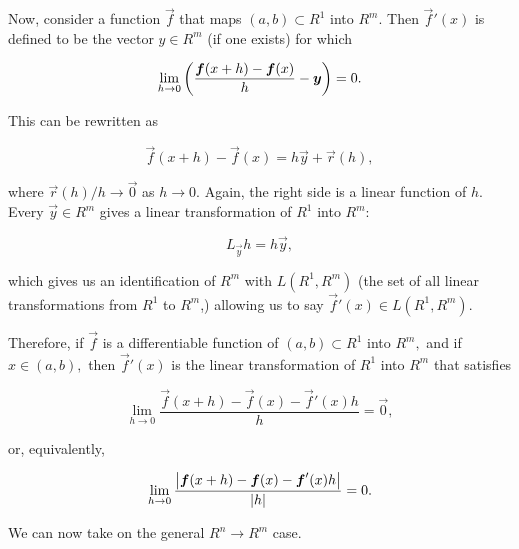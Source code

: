 \documentclass{article}
\begin{document}
\begin{remark}
Now, consider a \@{function} $\vec{f}$ that maps $(a, b) \subset R^1$ into $R^m.$ Then $\vec{f}'(x)$ is defined to be the \@{vector} $y \in R^m$ (if one exists) for which

\[ \lim_{h \to 0} \left(\frac{\boldsymbol{f}(x+h) - \boldsymbol{f}(x)}{h}  - \boldsymbol{y}\right) = 0. \]

This can be rewritten as

\[ \vec{f}(x + h) - \vec{f}(x) = h \vec{y} + \vec{r}(h), \]

where $\vec{r}(h)/h \to \vec{0}$ as $h \to 0.$ Again, the right side is a linear function of $h.$ Every $\vec{y} \in R^m$ gives a linear transformation of $R^1$ into $R^m:$

\[ L_\vec{y}{h} = h \vec{y}, \]

which gives us an identification of $R^m$ with $L(R^1, R^m)$ (the set of all linear transformations from $R^1$ to $R^m$,) allowing us to say $\vec{f}'(x) \in L(R^1, R^m)$.

Therefore, if $\vec{f}$ is a \@{differentiable} \@{function} of $(a, b) \subset R^1$ into $R^m,$ and if $x \in (a, b),$ then $\vec{f}'(x)$ is the linear transformation of $R^1$ into $R^m$ that satisfies

\[ \lim_{h \to 0} \frac{\vec{f}(x + h) - \vec{f}(x) - \vec{f}'(x) h}{h} = \vec{0}, \]

or, equivalently,

\[ \lim_{h \to 0} \frac{\left| \boldsymbol{f}(x + h) - \boldsymbol{f}(x) - \boldsymbol{f}'(x) h \right|}{\left| h \right|} = 0. \]

We can now take on the general $R^n \to R^m$ case.
\end{remark}
\end{document}
